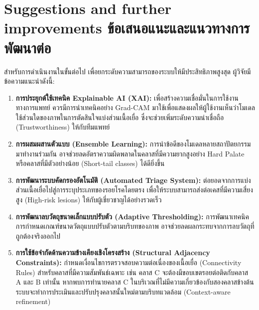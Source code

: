 \section{\ifenglish%
Suggestions and further improvements
\else%
ข้อเสนอแนะและแนวทางการพัฒนาต่อ
\fi
}
สำหรับการดำเนินงานในขั้นต่อไป เพื่อยกระดับความสามารถของระบบให้มีประสิทธิภาพสูงสุด ผู้วิจัยมีข้อความแนะนำดังนี้:
\begin{enumerate}
    \item \textbf{การประยุกต์ใช้เทคนิค Explainable AI (XAI):} เพื่อสร้างความเชื่อมั่นในการใช้งานทางการแพทย์ ควรมีการนำเทคนิคอย่าง Grad-CAM มาใช้เพื่อแสดงผลให้ผู้ใช้งานเห็นว่าโมเดลใช้ส่วนใดของภาพในการตัดสินใจแบ่งส่วนเนื้อเยื่อ ซึ่งจะช่วยเพิ่มระดับความน่าเชื่อถือ (Trustworthiness) ให้กับทีมแพทย์
    \item \textbf{การผสมผสานตัวแบบ (Ensemble Learning):} การนำข้อดีของโมเดลหลายสถาปัตยกรรมมาทำงานร่วมกัน อาจช่วยลดอัตราความผิดพลาดในคลาสที่มีความยากสูงอย่าง Hard Palate หรือคลาสที่มีตัวอย่างน้อย (Short-tail classes) ได้ดียิ่งขึ้น
    \item \textbf{การพัฒนาระบบคัดกรองอัตโนมัติ (Automated Triage System):} ต่อยอดจากการแบ่งส่วนเนื้อเยื่อไปสู่การระบุประเภทของรอยโรคโดยตรง เพื่อให้ระบบสามารถส่งต่อเคสที่มีความเสี่ยงสูง (High-risk lesions) ให้กับผู้เชี่ยวชาญได้อย่างรวดเร็ว
    \item \textbf{การพัฒนาลบวัตถุขนาดเล็กแบบปรับตัว (Adaptive Thresholding):} การพัฒนาเทคนิคการกำหนดเกณฑ์ขนาดวัตถุแบบปรับตัวตามบริบทของภาพ อาจช่วยลดผลกระทบจากการลบวัตถุที่ถูกต้องจริงออกไป
    \item \textbf{การใช้ข้อจำกัดด้านความข้างเคียงเชิงโครงสร้าง (Structural Adjacency Constraints):} กำหนดเงื่อนไขการตรวจสอบความต่อเนื่องของเนื้อเยื่อ (Connectivity Rules) สำหรับคลาสที่มีความสัมพันธ์เฉพาะ เช่น คลาส C จะต้องมีขอบเขตรอยต่อติดกับคลาส A และ B เท่านั้น หากพบการทำนายคลาส C ในบริเวณที่ไม่มีความเกี่ยวข้องกับสองคลาสข้างต้น ระบบจะทำการประเมินและปรับปรุงคลาสนั้นใหม่ตามบริบทแวดล้อม (Context-aware refinement)
\end{enumerate}
